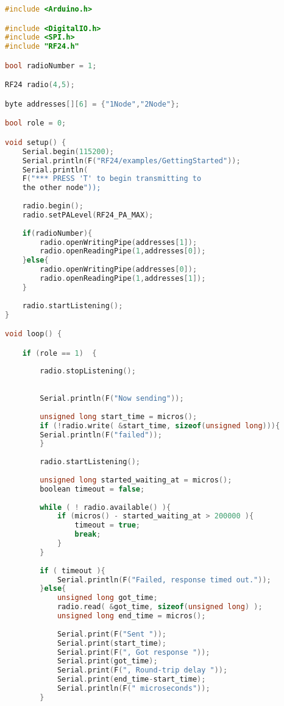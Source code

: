 \clearpage

\begin{lstlisting}[language=C++, caption={Codigo Ejemplo para módulo nRF24L01+}, captionpos=b]
#include <Arduino.h>

#include <DigitalIO.h>
#include <SPI.h>
#include "RF24.h"

bool radioNumber = 1;

RF24 radio(4,5);

byte addresses[][6] = {"1Node","2Node"};

bool role = 0;

void setup() {
	Serial.begin(115200);
	Serial.println(F("RF24/examples/GettingStarted"));
	Serial.println(
	F("*** PRESS 'T' to begin transmitting to 
	the other node"));
	
	radio.begin();
	radio.setPALevel(RF24_PA_MAX);
	
	if(radioNumber){
		radio.openWritingPipe(addresses[1]);
		radio.openReadingPipe(1,addresses[0]);
	}else{
		radio.openWritingPipe(addresses[0]);
		radio.openReadingPipe(1,addresses[1]);
	}
	
	radio.startListening();
}

void loop() {

	if (role == 1)  {
	
		radio.stopListening();                                    
		
		
		Serial.println(F("Now sending"));
		
		unsigned long start_time = micros();                      
		if (!radio.write( &start_time, sizeof(unsigned long))){
		Serial.println(F("failed"));
		}
		
		radio.startListening();                                   
		
		unsigned long started_waiting_at = micros();              
		boolean timeout = false;                                  
		
		while ( ! radio.available() ){                            
			if (micros() - started_waiting_at > 200000 ){           
				timeout = true;
				break;
			}
		}
		
		if ( timeout ){                                           
			Serial.println(F("Failed, response timed out."));
		}else{
			unsigned long got_time;                               
			radio.read( &got_time, sizeof(unsigned long) );
			unsigned long end_time = micros();
			
			Serial.print(F("Sent "));
			Serial.print(start_time);
			Serial.print(F(", Got response "));
			Serial.print(got_time);
			Serial.print(F(", Round-trip delay "));
			Serial.print(end_time-start_time);
			Serial.println(F(" microseconds"));
		}
		

\end{lstlisting}
